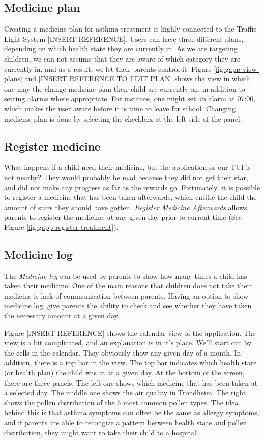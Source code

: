 \subsection{Medicine plan}
\label{sec:description-medicine-plan}
Creating a medicine plan for asthma treatment is highly connected to the Traffic Light System [INSERT REFERENCE].
Users can have three different plans, depending on which health state they are currently in. As we are targeting children, we can not assume that they are aware of which category they are currently in, and as a result, we let their parents control it. Figure \ref{fig:gapp-view-plans} and [INSERT REFERENCE TO EDIT PLAN] shows the view in which one may the change medicine plan their child are currently on, in addition to setting alarms where appropriate. For instance, one might set an alarm at 07:00, which makes the user aware before it is time to leave for school. Changing medicine plan is done by selecting the checkbox at the left side of the panel.  

\subsection{Register medicine}
\label{sec:description-register-medicine}
What happens if a child need their medicine, but the application or our TUI is not nearby? They would probably be mad because they did not get their star, and did not make any progress as far as the rewards go. Fortunately, it is possible to register a medicine that has been taken afterwards, which entitle the child the amount of stars they should have gotten. \emph{Register Medicine Afterwards} allows parents to register the medicine, at any given day prior to current time (See Figure \ref{fig:gapp-register-treatment}).  


\subsection{Medicine log}
\label{sec:description-medicine-log}
The \emph{Medicine log} can be used by parents to show how many times a child has taken their medicine. One of the main reasons that children does not take their medicine is lack of communication between parents. Having an option to show medicine log, give parents the ability to check and see whether they have taken the necessary amount at a given day.

Figure [INSERT REFERENCE] shows the calendar view of the application. The view is a bit complicated, and an explanation is in it's place. We'll start out by the cells in the calendar. They obviously show any given day of a month. In addition, there is a top bar in the view. The top bar indicates which health state (or health plan) the child was in at a given day. At the bottom of the screen, there are three panels. The left one shows which medicine that has been taken at a selected day. The middle one shows the air quality in Trondheim. The right shows the pollen distribution of the 6 most common pollen types. The idea behind this is that asthma symptoms can often be the same as allergy symptoms, and if parents are able to recongize a pattern between health state and pollen distribution, they might want to take their child to a hospital.   
 
